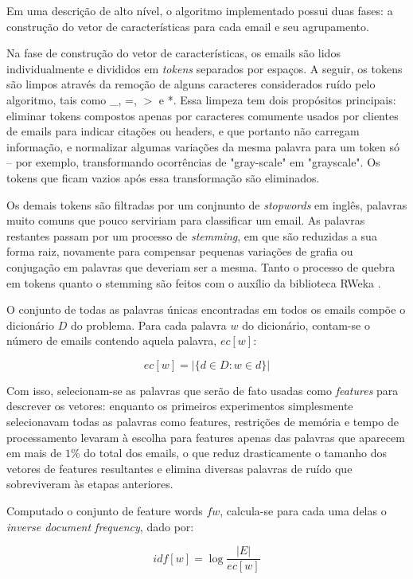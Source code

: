 \documentclass[10pt,twocolumn,letterpaper]{article}
\begin{document}
Em uma descrição de alto nível, o algoritmo implementado possui duas fases: a construção do vetor de características para cada email e seu agrupamento.

Na fase de construção do vetor de características, os emails são lidos individualmente e divididos em \emph{tokens} separados por espaços. A seguir, os tokens são limpos através da remoção de alguns caracteres considerados ruído pelo algoritmo, tais como \_, =, $>$ e *. Essa limpeza tem dois propósitos principais: eliminar tokens compostos apenas por caracteres comumente usados por clientes de emails para indicar citações ou headers, e que portanto não carregam informação, e normalizar algumas variações da mesma palavra para um token só -- por exemplo, transformando ocorrências de "gray-scale" em "grayscale". Os tokens que ficam vazios após essa transformação são eliminados.

Os demais tokens são filtradas por um conjnunto de \emph{stopwords} em inglês, palavras muito comuns que pouco serviriam para classificar um email. As palavras restantes passam por um processo de \emph{stemming}, em que são reduzidas a sua forma raiz, novamente para compensar pequenas variações de grafia ou conjugação em palavras que deveriam ser a mesma. Tanto o processo de quebra em tokens quanto o stemming são feitos com o auxílio da biblioteca RWeka \cite{RWeka}.

O conjunto de todas as palavras únicas encontradas em todos os emails compõe o dicionário $D$ do problema. Para cada palavra $w$ do dicionário, contam-se o número de emails contendo aquela palavra, $ec[w]$:

\begin{displaymath}
ec[w] = |\{ d \in D : w \in d\}|
\end{displaymath}

Com isso, selecionam-se as palavras que serão de fato usadas como \emph{features} para descrever os vetores: enquanto os primeiros experimentos simplesmente selecionavam todas as palavras como features, restrições de memória e tempo de processamento levaram à escolha para features apenas das palavras que aparecem em mais de $1\%$ do total dos emails, o que reduz drasticamente o tamanho dos vetores de features resultantes e elimina diversas palavras de ruído que sobreviveram às etapas anteriores. 

Computado o conjunto de feature words $fw$, calcula-se para cada uma delas o \emph{inverse document frequency}, dado por:

\begin{displaymath}
idf[w] = \log{\frac{|E|}{ec[w]}}
\end{displaymath}
\end{document}
